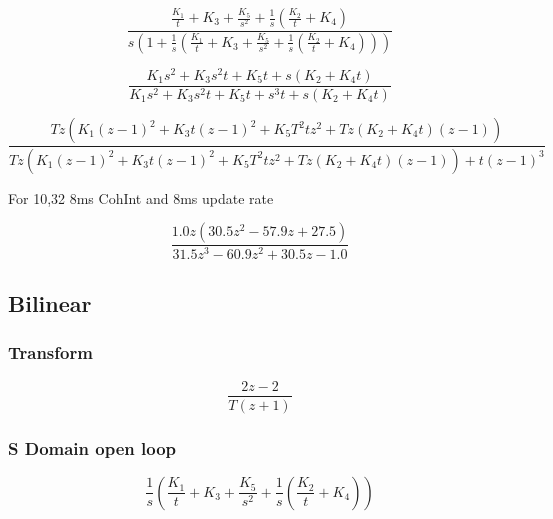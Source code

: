 \begin{equation}
\frac{\frac{K_{1}}{t} + K_{3} + \frac{K_{5}}{s^{2}} + \frac{1}{s} \left(\frac{K_{2}}{t} + K_{4}\right)}{s \left(1 + \frac{1}{s} \left(\frac{K_{1}}{t} + K_{3} + \frac{K_{5}}{s^{2}} + \frac{1}{s} \left(\frac{K_{2}}{t} + K_{4}\right)\right)\right)}
\end{equation}

\begin{equation}
\frac{K_{1} s^{2} + K_{3} s^{2} t + K_{5} t + s \left(K_{2} + K_{4} t\right)}{K_{1} s^{2} + K_{3} s^{2} t + K_{5} t + s^{3} t + s \left(K_{2} + K_{4} t\right)}
\end{equation}

\begin{equation}
\frac{T z \left(K_{1} \left(z - 1\right)^{2} + K_{3} t \left(z - 1\right)^{2} + K_{5} T^{2} t z^{2} + T z \left(K_{2} + K_{4} t\right) \left(z - 1\right)\right)}{T z \left(K_{1} \left(z - 1\right)^{2} + K_{3} t \left(z - 1\right)^{2} + K_{5} T^{2} t z^{2} + T z \left(K_{2} + K_{4} t\right) \left(z - 1\right)\right) + t \left(z - 1\right)^{3}}
\end{equation}

For 10,32 8ms CohInt and 8ms update rate

\begin{equation}
\frac{1.0 z \left(30.5 z^{2} - 57.9 z + 27.5\right)}{31.5 z^{3} - 60.9 z^{2} + 30.5 z - 1.0}
\end{equation}

\clearpage


\subsection{Bilinear}

\subsubsection{Transform}
\begin{equation}
\frac{2 z - 2}{T \left(z + 1\right)}
\end{equation}

\subsubsection{S Domain open loop}
\begin{equation}
\frac{1}{s} \left(\frac{K_{1}}{t} + K_{3} + \frac{K_{5}}{s^{2}} + \frac{1}{s} \left(\frac{K_{2}}{t} + K_{4}\right)\right)
\end{equation}

